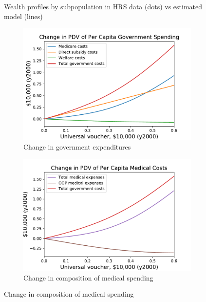 \documentclass[12pt,pdftex,letterpaper]{article}
\begin{document}
\begin{figure}[h!]
\begin{subfigure}[b]{0.49\textwidth}
   \end{subfigure}
   \caption{Wealth profiles by subpopulation in HRS data (dots) vs estimated model (lines)}
   \label{fig:WealthBySubpop}
\end{figure}


\newpage

\begin{figure}[h!]
    \centering
    \begin{subfigure}[b]{0.49\textwidth}
        \centering
        \includegraphics[width=\textwidth]{../Figures/UniversalSubGovtChange.pdf}
        \caption{Change in government expenditures}
    \end{subfigure}
    \begin{subfigure}[b]{0.49\textwidth}
        \centering
        \includegraphics[width=\textwidth]{../Figures/UniversalSubMedChange.pdf}
        \caption{Change in composition of medical spending}

\end{subfigure}
\end{figure}
\end{document}
